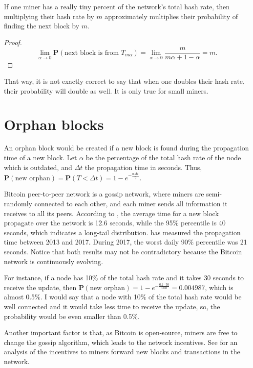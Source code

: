 \begin{cor}
	If one miner has a really tiny percent of the network's total hash rate, then multiplying their hash rate by $m$ approximately multiplies their probability of finding the next block by $m$.
\end{cor}
\begin{proof}
	$$\lim_{\alpha \rightarrow 0} \mathbf{P}(\text{next block is from $T_{m \alpha}$}) = \lim_{\alpha \rightarrow 0} \frac{m}{m \alpha + 1 - \alpha} = m.$$
\end{proof}

That way, it is not exactly correct to say that when one doubles their hash rate, their probability will double as well. It is only true for small miners.


\section{Orphan blocks}
An orphan block would be created if a new block is found during the propagation time of a new block. Let $\alpha$ be the percentage of the total hash rate of the node which is outdated, and $\Delta t$ the propagation time in seconds. Thus, $\mathbf{P}(\text{new orphan}) = \mathbf{P}(T < \Delta t) = 1 - e^{-\frac{\alpha \Delta t}{\eta}}$.

Bitcoin peer-to-peer network is a gossip network, where miners are semi-randomly connected to each other, and each miner sends all information it receives to all its peers. According to \citet{decker2013information}, the average time for a new block propagate over the network is 12.6 seconds, while the 95\% percentile is 40 seconds, which indicates a long-tail distribution. \citet{bitcoinstats} has measured the propagation time between 2013 and 2017. During 2017, the worst daily 90\% percentile was 21 seconds. Notice that both results may not be contradictory because the Bitcoin network is continuously evolving.

For instance, if a node has 10\% of the total hash rate and it takes 30 seconds to receive the update, then $\mathbf{P}(\text{new orphan}) = 1 - e^{-\frac{0.1 \cdot 30}{600}} = 0.004987$, which is almost 0.5\%. I would say that a node with 10\% of the total hash rate would be well connected and it would take less time to receive the update, so, the probability would be even smaller than 0.5\%.

Another important factor is that, as Bitcoin is open-source, miners are free to change the gossip algorithm, which leads to the network incentives. See \citet{babaioff2012bitcoin} for an analysis of the incentives to miners forward new blocks and transactions in the network.

